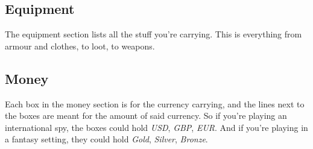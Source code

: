 \subsection{Equipment}
The equipment section lists all the stuff you're carrying.
This is everything from armour and clothes, to loot, to weapons.

\subsection{Money}
Each box in the money section is for the currency carrying, and the lines next to the boxes are meant for the amount of said currency.
So if you're playing an international spy, the boxes could hold \textit{USD}, \textit{GBP}, \textit{EUR}.
And if you're playing in a fantasy setting, they could hold \textit{Gold}, \textit{Silver}, \textit{Bronze}.
